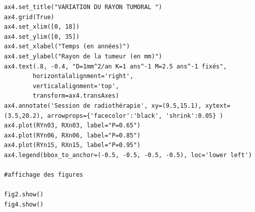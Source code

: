 \documentclass[12pt,a4paper]{article}
\begin{document}
\begin{lstlisting}[style=stylepython]
ax4.set_title("VARIATION DU RAYON TUMORAL ")
ax4.grid(True)
ax4.set_xlim([0, 18])
ax4.set_ylim([0, 35])
ax4.set_xlabel("Temps (en années)")
ax4.set_ylabel("Rayon de la tumeur (en mm)")
ax4.text(.8, -0.4, "D=1mm^2/an K=1 ans^-1 M=2.5 ans^-1 fixés",
        horizontalalignment='right',
        verticalalignment='top',
        transform=ax4.transAxes)
ax4.annotate('Session de radiothérapie', xy=(9.5,15.1), xytext=(3.5,20.2), arrowprops={'facecolor':'black', 'shrink':0.05} )
ax4.plot(RYn03, RXn03, label="P=0.65")
ax4.plot(RYn06, RXn06, label="P=0.85")
ax4.plot(RYn15, RXn15, label="P=0.95")
ax4.legend(bbox_to_anchor=(-0.5, -0.5, -0.5, -0.5), loc='lower left')

#affichage des figures 

fig2.show()
fig4.show()
\end{lstlisting}
\\

\newpage
\end{document}
